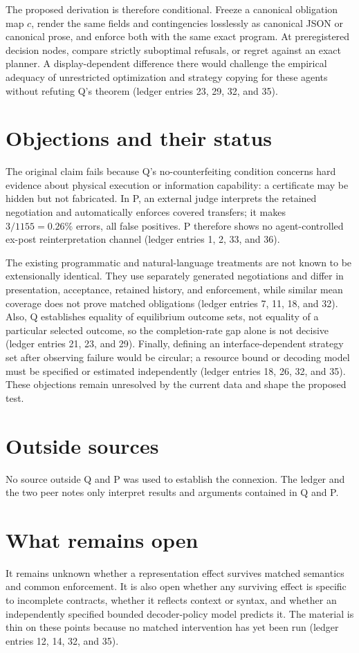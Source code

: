 \documentclass{article}
\begin{document}
The proposed derivation is therefore conditional. Freeze a canonical obligation
map \(c\), render the same fields and contingencies losslessly as canonical JSON
or canonical prose, and enforce both with the same exact program. At preregistered
decision nodes, compare strictly suboptimal refusals, or regret against an exact
planner. A display-dependent difference there would challenge the empirical
adequacy of unrestricted optimization and strategy copying for these agents
without refuting Q's theorem (ledger entries 23, 29, 32, and 35).

\section{Objections and their status}
The original claim fails because Q's no-counterfeiting condition concerns hard
evidence about physical execution or information capability: a certificate may
be hidden but not fabricated. In P, an external judge interprets the retained
negotiation and automatically enforces covered transfers; it makes
\(3/1155=0.26\%\) errors, all false positives. P therefore shows no
agent-controlled ex-post reinterpretation channel (ledger entries 1, 2, 33,
and 36).

The existing programmatic and natural-language treatments are not known to be
extensionally identical. They use separately generated negotiations and differ
in presentation, acceptance, retained history, and enforcement, while similar
mean coverage does not prove matched obligations (ledger entries 7, 11, 18,
and 32). Also, Q establishes equality of equilibrium outcome sets, not equality
of a particular selected outcome, so the completion-rate gap alone is not
decisive (ledger entries 21, 23, and 29). Finally, defining an
interface-dependent strategy set after observing failure would be circular; a
resource bound or decoding model must be specified or estimated independently
(ledger entries 18, 26, 32, and 35). These objections remain unresolved by the
current data and shape the proposed test.

\section{Outside sources}
No source outside Q and P was used to establish the connexion. The ledger and
the two peer notes only interpret results and arguments contained in Q and P.

\section{What remains open}
It remains unknown whether a representation effect survives matched semantics
and common enforcement. It is also open whether any surviving effect is
specific to incomplete contracts, whether it reflects context or syntax, and
whether an independently specified bounded decoder-policy model predicts it.
The material is thin on these points because no matched intervention has yet
been run (ledger entries 12, 14, 32, and 35).
\end{document}
